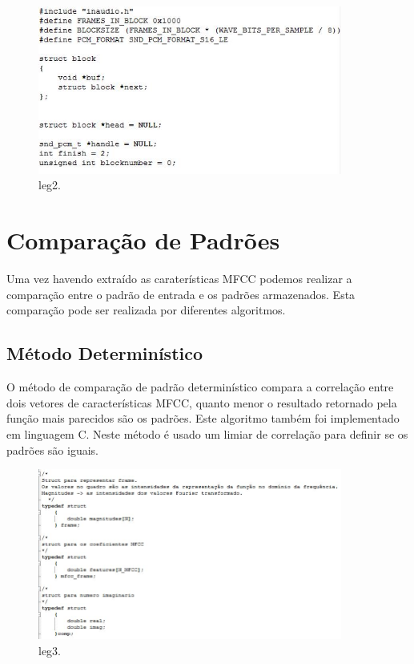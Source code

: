 \begin{figure}[H]
\centering %
\includegraphics[width=10cm]{img/escinaudio.jpg} %
\caption{leg2.}
\label{fig:inau}
\end{figure}




\section{Comparação de Padrões}
\quad Uma vez havendo extraído as caraterísticas MFCC podemos realizar a comparação entre o padrão de entrada e os
padrões armazenados. Esta comparação pode ser realizada por diferentes algoritmos.




\subsection{Método Determinístico}
\label{sec:det}
\quad O método de comparação de padrão determinístico compara a correlação entre dois vetores de características MFCC, quanto menor o resultado retornado pela função mais parecidos são os padrões. Este algoritmo também foi implementado em linguagem C. Neste método é usado um limiar de correlação para definir se os padrões são iguais. 
\begin{figure}[H]
\centering %
\includegraphics[width=10cm]{img/struct.jpg} %
\caption{leg3.}
\label{fig:str}
\end{figure}



